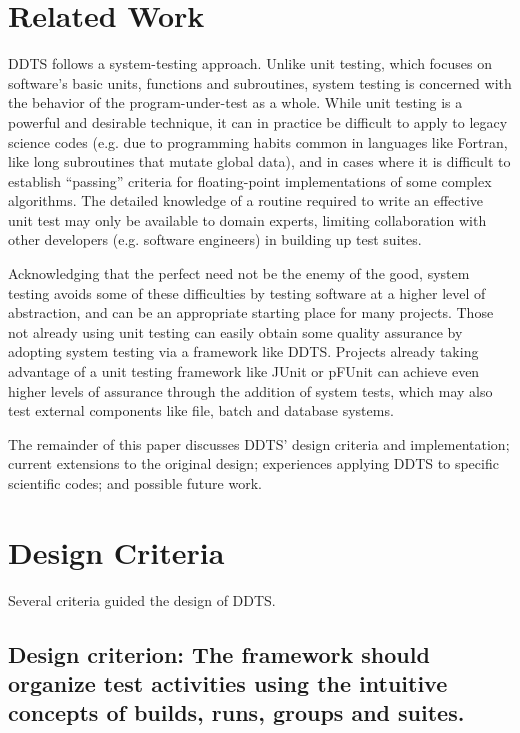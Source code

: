 \documentclass[conference]{IEEEtran}
\begin{document}
\section{Related Work}

DDTS follows a system-testing approach. Unlike unit testing, which focuses on software's basic units, functions and subroutines, system testing is concerned with the behavior of the program-under-test as a whole. While unit testing is a powerful and desirable technique, it can in practice be difficult to apply to legacy science codes \cite{clune} (e.g. due to programming habits common in languages like Fortran, like long subroutines that mutate global data), and in cases where it is difficult to establish ``passing'' criteria for floating-point implementations of some complex algorithms. The detailed knowledge of a routine required to write an effective unit test may only be available to domain experts, limiting collaboration with other developers (e.g. software engineers) in building up test suites.

Acknowledging that the perfect need not be the enemy of the good, system testing avoids some of these difficulties by testing software at a higher level of abstraction, and can be an appropriate starting place for many projects. Those not already using unit testing can easily obtain some quality assurance by adopting system testing via a framework like DDTS. Projects already taking advantage of a unit testing framework like JUnit \cite{junit} or pFUnit \cite{pfunit} can achieve even higher levels of assurance through the addition of system tests, which may also test external components like file, batch and database systems.

The remainder of this paper discusses DDTS' design criteria and implementation; current extensions to the original design; experiences applying DDTS to specific scientific codes; and possible future work.

\section{Design Criteria}
Several criteria guided the design of DDTS.

\subsection{Design criterion: The framework should organize test activities using the intuitive concepts of builds, runs, groups and suites.}
\end{document}
